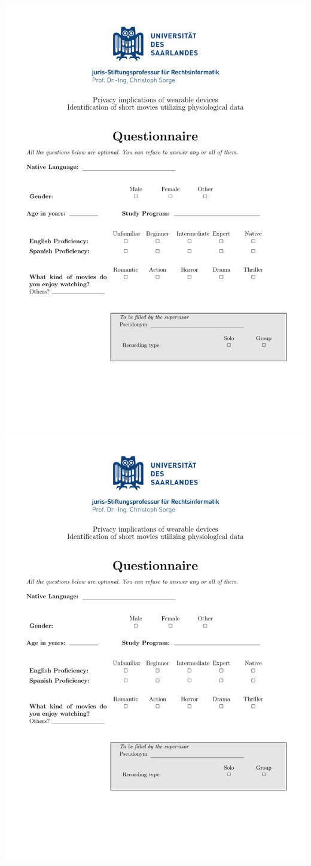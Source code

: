 \includegraphics[page=2,width=150mm]{pdf/questionner.pdf}
\newpage
\includegraphics[page=6,width=150mm]{pdf/questionner.pdf}
